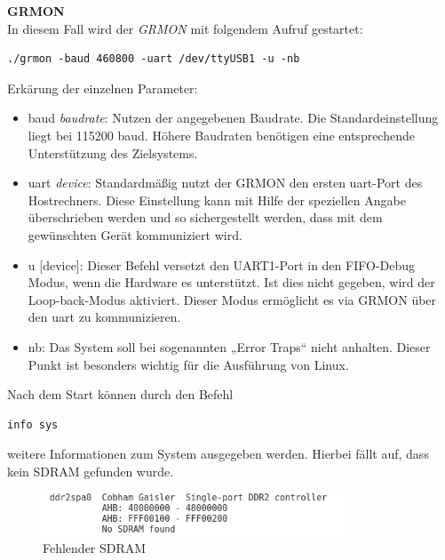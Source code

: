 \newpage
\textbf{GRMON}\\

In diesem Fall wird der \emph{GRMON} mit folgendem Aufruf gestartet:\\



\begin{lstlisting}[caption={Aufruf des GRMON},label={code:grmon}]
./grmon -baud 460800 -uart /dev/ttyUSB1 -u -nb
\end{lstlisting}


\vspace{5mm}
Erkärung der einzelnen Parameter:
\begin{itemize}
  \item baud \emph{baudrate}: Nutzen der angegebenen Baudrate. Die Standardeinstellung liegt bei 115200 baud. Höhere Baudraten benötigen eine entsprechende Unterstützung des Zielsystems.
  \item uart \emph{device}: Standardmäßig nutzt der GRMON den ersten \ac{uart}-Port des Hostrechners. Diese Einstellung kann mit Hilfe der speziellen Angabe überschrieben werden und so sichergestellt werden, dass mit dem gewünschten Gerät kommuniziert wird.
  \item u [device]: Dieser Befehl versetzt den UART1-Port in den FIFO-Debug Modus, wenn die Hardware es unterstützt. Ist dies nicht gegeben, wird der Loop-back-Modus aktiviert. Dieser Modus ermöglicht es via GRMON über den \ac{uart} zu kommunizieren.
  \item nb: Das System soll bei sogenannten „Error Traps“ nicht anhalten. Dieser Punkt ist besonders wichtig für die Ausführung von Linux.
\end{itemize}
\newpage
Nach dem Start können durch den Befehl\\

\begin{lstlisting}[caption={Abruf von Systeminformationen},label={code:infosys}]
info sys
   \end{lstlisting}

weitere Informationen zum System ausgegeben werden. Hierbei fällt auf, dass kein SDRAM gefunden wurde.\\

\begin{figure}[H]
\centering
\includegraphics[width=0.8\textwidth]{Hauptteil/nosdram.png}
\caption{Fehlender SDRAM}
\label{fig:nosdram}
\end{figure}

